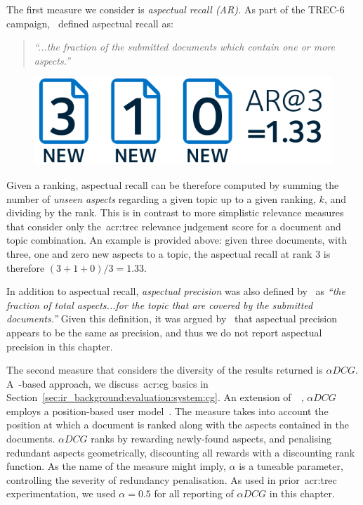 The first measure we consider is \emph{aspectual recall (AR).} As part of the TREC-6 campaign,~\cite{over1998trec} defined aspectual recall as:

\begin{quote}
    \emph{``...the fraction of the submitted documents which contain one or more aspects.''}
\end{quote}

\begin{figure}
    \begin{center}
    \vspace*{-10mm}
    \includegraphics[width=1\textwidth]{figures/ch8-aspectual_recall.pdf}
    \end{center}
    \label{fig:aspectual_recall}
\end{figure}

Given a ranking, aspectual recall can be therefore computed by summing the number of \emph{unseen aspects} regarding a given topic up to a given ranking, $k$, and dividing by the rank. This is in contrast to more simplistic relevance measures that consider only the~\gls{acr:trec} relevance judgement score for a document and topic combination. An example is provided above: given three documents, with three, one and zero new aspects to a topic, the aspectual recall at rank 3 is therefore $(3+1+0)/3 = 1.33$.

In addition to aspectual recall, \emph{aspectual precision} was also defined by~\cite{over2001trec} as \emph{``the fraction of total aspects...for the topic that are covered by the submitted documents.''} Given this definition, it was argued by~\cite{sanderson2010test} that aspectual precision appears to be the same as precision, and thus we do not report aspectual precision in this chapter.

The second measure that considers the diversity of the results returned is $\alpha DCG$. A~-based approach, we discuss~\gls{acr:cg} basics in Section~\ref{sec:ir_background:evaluation:system:cg}. An extension of~~\citep{jarvelin2002cg}, $\alpha DCG$ employs a position-based user model~\citep{clarke2008adcg}. The measure takes into account the position at which a document is ranked along with the aspects contained in the documents. $\alpha DCG$ ranks by rewarding newly-found aspects, and penalising redundant aspects geometrically, discounting all rewards with a discounting rank function. As the name of the measure might imply, $\alpha$ is a tuneable parameter, controlling the severity of redundancy penalisation. As used in prior~\gls{acr:trec} experimentation, we used $\alpha=0.5$ for all reporting of $\alpha DCG$ in this chapter.

